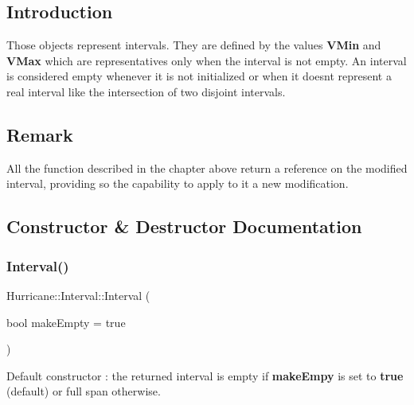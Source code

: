 \hypertarget{classHurricane_1_1Interval_secIntervalIntro}{}\subsection{Introduction}\label{classHurricane_1_1Interval_secIntervalIntro}
Those objects represent intervals. They are defined by the values {\bfseries V\+Min} and {\bfseries V\+Max} which are representatives only when the interval is not empty. An interval is considered empty whenever it is not initialized or when it doesn\textquotesingle{}t represent a real interval like the intersection of two disjoint intervals.\hypertarget{classHurricane_1_1Interval_secIntervalRemark}{}\subsection{Remark}\label{classHurricane_1_1Interval_secIntervalRemark}
All the function described in the chapter above return a reference on the modified interval, providing so the capability to apply to it a new modification. 

\subsection{Constructor \& Destructor Documentation}
\mbox{\label{classHurricane_1_1Interval_a02b04ad7ca380422098992fa8ff5f546}} 
\subsubsection{\texorpdfstring{Interval()}{Interval()}\hspace{0.1cm}{\footnotesize\ttfamily [1/4]}}
{\footnotesize\ttfamily Hurricane\+::\+Interval\+::\+Interval (\begin{DoxyParamCaption}\item[{bool}]{make\+Empty = {\ttfamily true} }\end{DoxyParamCaption})}

Default constructor \+: the returned interval is empty if {\bfseries make\+Empy} is set to {\bfseries true} (default) or full span otherwise. \mbox{\label{classHurricane_1_1Interval_ac0f6c351e64e9be3e9a51e07dff10778}} 
